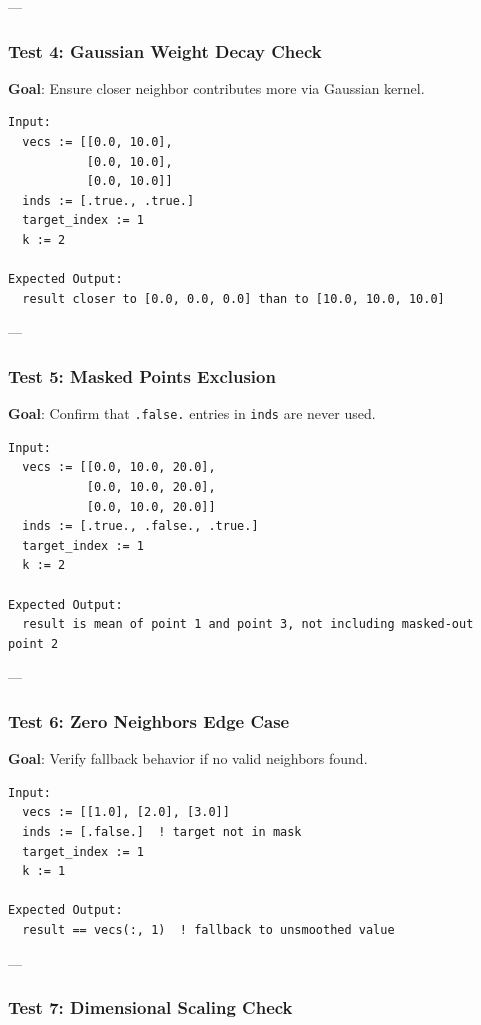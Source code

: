 \documentclass{article}
\begin{document}
---

\subsubsection*{Test 4: Gaussian Weight Decay Check}

\textbf{Goal}: Ensure closer neighbor contributes more via Gaussian kernel.

\begin{verbatim}
Input:
  vecs := [[0.0, 10.0],
           [0.0, 10.0],
           [0.0, 10.0]]
  inds := [.true., .true.]
  target_index := 1
  k := 2

Expected Output:
  result closer to [0.0, 0.0, 0.0] than to [10.0, 10.0, 10.0]
\end{verbatim}

---

\subsubsection*{Test 5: Masked Points Exclusion}

\textbf{Goal}: Confirm that \texttt{.false.} entries in \texttt{inds} are never used.

\begin{verbatim}
Input:
  vecs := [[0.0, 10.0, 20.0],
           [0.0, 10.0, 20.0],
           [0.0, 10.0, 20.0]]
  inds := [.true., .false., .true.]
  target_index := 1
  k := 2

Expected Output:
  result is mean of point 1 and point 3, not including masked-out point 2
\end{verbatim}

---

\subsubsection*{Test 6: Zero Neighbors Edge Case}

\textbf{Goal}: Verify fallback behavior if no valid neighbors found.

\begin{verbatim}
Input:
  vecs := [[1.0], [2.0], [3.0]]
  inds := [.false.]  ! target not in mask
  target_index := 1
  k := 1

Expected Output:
  result == vecs(:, 1)  ! fallback to unsmoothed value
\end{verbatim}

---

\subsubsection*{Test 7: Dimensional Scaling Check}
\end{document}
